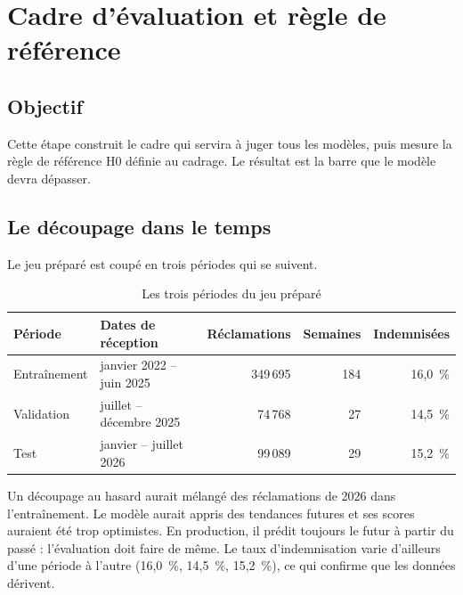 \documentclass[11pt,a4paper]{article}
\begin{document}
\section{Cadre d'évaluation et règle de référence}


\subsection{Objectif}

Cette étape construit le cadre qui servira à juger tous les modèles, puis mesure la règle de référence H0 définie au cadrage. Le résultat est la barre que le modèle devra dépasser.

\subsection{Le découpage dans le temps}

Le jeu préparé est coupé en trois périodes qui se suivent.

\begin{table}[H]
\centering\small
\begin{tabular}{@{}l l r r r@{}}
\toprule
Période & Dates de réception & Réclamations & Semaines & Indemnisées \\
\midrule
Entraînement & janvier 2022 -- juin 2025 & 349\,695 & 184 & 16,0~\% \\
Validation & juillet -- décembre 2025 & 74\,768 & 27 & 14,5~\% \\
Test & janvier -- juillet 2026 & 99\,089 & 29 & 15,2~\% \\
\bottomrule
\end{tabular}
\caption{Les trois périodes du jeu préparé}
\end{table}

Un découpage au hasard aurait mélangé des réclamations de 2026 dans l'entraînement. Le modèle aurait appris des tendances futures et ses scores auraient été trop optimistes. En production, il prédit toujours le futur à partir du passé : l'évaluation doit faire de même. Le taux d'indemnisation varie d'ailleurs d'une période à l'autre (16,0~\%, 14,5~\%, 15,2~\%), ce qui confirme que les données dérivent.
\end{document}

